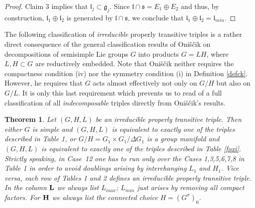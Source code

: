 \documentclass[10]{amsart}
\newtheorem{thm}{Theorem}[section]
\theoremstyle{remark}
\theoremstyle{definition}
\numberwithin{equation}{section}
\newcommand{\fg}{{\mathfrak g}}
\newcommand{\fl}{{\mathfrak l}}
\newcommand{\fs}{{\mathfrak s}}
\begin{document}
{\begin{proof}
Claim 3 implies that $\fl_j\subset\fg_j$. Since $\fl\cap\fs=E_1\oplus E_2$ and thus, by construction, $\fl_1\oplus\fl_2$ is generated by $\fl\cap\fs$,
we conclude that $\fl_1\oplus\fl_2=\fl_{min}$.
\end{proof}
%

The following classification of {\em irreducible} properly transitive triples is a rather direct consequence of the general classification results of Oni\v s\v cik \cite{Oni69} on decompositions of semisimple Lie groups
$G$ into products $G=LH$, where $L,H\subset G$ are reductively embedded. Note that Oni\v s\v cik neither requires the compactness condition (iv) nor the symmetry
condition (i) in Definition \ref{defck}. However, he requires that $G$ acts almost effectively not only on $G/H$ but also on $G/L$. It is only this last requirement
which prevents us to read of a full classification of all {\em indecomposable} triples directly from Oni\v s\v cik's results. 
\begin{thm}\label{listck}
Let $(G,H,L)$ be an irreducible properly transitive triple. Then either $G$ is simple and $(G,H,L)$ is equivalent to exactly one of the triples described in Table 1, or $G/H=
G_1\times G_1/\Delta G_1$ is a group manifold and $(G,H,L)$ is equivalent to exactly one of the triples described in Table \ref{foxi}. Strictly speaking, in Case~12 one has to run only over
the Cases 1,3,5,6,7,8 in Table 1 in order to avoid doublings arising by interchanging $L_1$ and $H_1$.  Vice versa, each row of Tables 1 and 2 defines an irreducible
properly transitive triple. In the column $\bf L$ we always list $L_{max}$; $L_{min}$ just arises by removing all compact factors. For $\bf H$ we always list the connected choice $H=(G^\sigma)_0$.
\setcounter{table}{0}
\begin{table}[h]
\caption{$G$ simple}\label{fix}
\begin{center}
\end{center}
\end{table}
\end{thm}}
\end{document}
